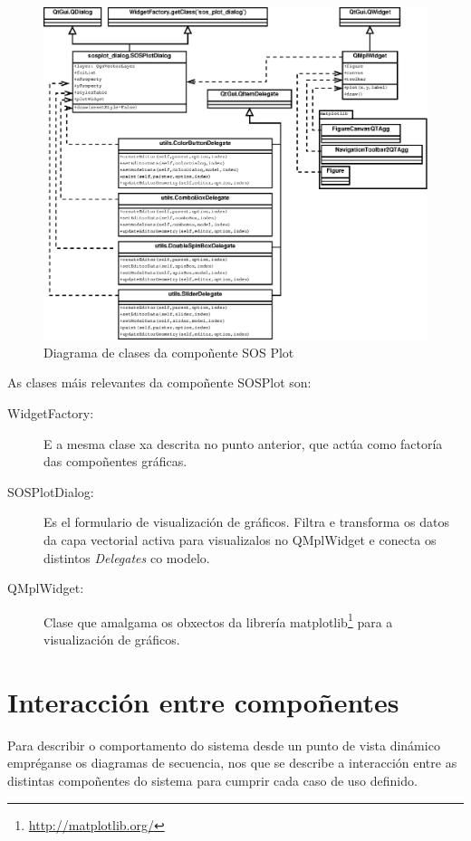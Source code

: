 \begin{figure}
 \centering
 \includegraphics[width=\textwidth]{images/clases_sos_plot.eps}
 \caption{Diagrama de clases da compoñente SOS Plot}
 \label{fig:diaClassSOSPlot}
\end{figure}

As clases máis relevantes da compoñente SOSPlot son:
\begin{description}
\item[WidgetFactory:] E a mesma clase xa descrita no punto anterior, que actúa como factoría das compoñentes gráficas.
\item[SOSPlotDialog:] Es el formulario de visualización de gráficos. Filtra e transforma os datos da capa vectorial activa para visualizalos no QMplWidget e conecta os distintos \emph{Delegates} co modelo.
\item[QMplWidget:] Clase que amalgama os obxectos da librería matplotlib\footnote{\url{http://matplotlib.org/}} para a visualización de gráficos.
\end{description}

\section{Interacción entre compoñentes}
Para describir o comportamento do sistema desde un punto de vista dinámico empréganse os diagramas de secuencia, nos que se describe a interacción entre as distintas compoñentes do sistema para cumprir cada caso de uso definido.

